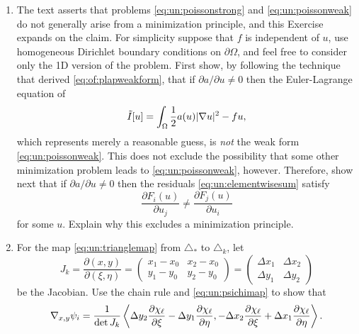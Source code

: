 \begin{enumerate}
\item \label{exer:un:notminimization}  The text asserts that problems \eqref{eq:un:poissonstrong} and \eqref{eq:un:poissonweak} do not generally arise from a minimization principle, and this Exercise expands on the claim.  For simplicity suppose that $f$ is independent of $u$, use homogeneous Dirichlet boundary conditions on $\partial \Omega$, and feel free to consider only the 1D version of the problem.  First show, by following the technique that derived \eqref{eq:of:plapweakform}, that if $\partial a/\partial u \ne 0$ then the Euler-Lagrange equation of
\begin{equation}
  \tilde I[u] = \int_\Omega \frac{1}{2} a(u) |\nabla u|^2 - f u,  \label{eq:un:nottheobjective}
\end{equation}
which represents merely a reasonable guess, is \emph{not} the weak form \eqref{eq:un:poissonweak}.  This does not exclude the possibility that some other minimization problem leads to \eqref{eq:un:poissonweak}, however.  Therefore, show next that if $\partial a/\partial u \ne 0$ then the residuals \eqref{eq:un:elementwisesum} satisfy
\begin{equation}
  \frac{\partial F_i(u)}{\partial u_j} \ne \frac{\partial F_j(u)}{\partial u_i} \label{eq:un:symmetryresidualsdonthave}
\end{equation}
for some $u$.  Explain why this excludes a minimization principle.
\item  \label{exer:un:gradientdetails}  For the map \eqref{eq:un:trianglemap} from $\triangle_\ast$ to $\triangle_k$, let
    $$J_k = \frac{\partial (x,y)}{\partial (\xi,\eta)} = \begin{pmatrix}
    x_1 - x_0 & x_2 - x_0 \\
    y_1 - y_0 & y_2 - y_0 \end{pmatrix}
    = \begin{pmatrix}
    \Delta x_1 & \Delta x_2 \\
    \Delta y_1 & \Delta y_2
    \end{pmatrix}$$
be the Jacobian.  Use the chain rule and \eqref{eq:un:psichimap} to show that
\begin{equation}
\nabla_{x,y} \psi_i = \frac{1}{\det J_k} \left<\Delta y_2 \frac{\partial \chi_\ell}{\partial \xi} - \Delta y_1 \frac{\partial \chi_\ell}{\partial \eta}, - \Delta x_2 \frac{\partial \chi_\ell}{\partial \xi} + \Delta x_1 \frac{\partial \chi_\ell}{\partial \eta}\right>. \label{eq:un:gradpsionref}
\end{equation}

\end{enumerate}
